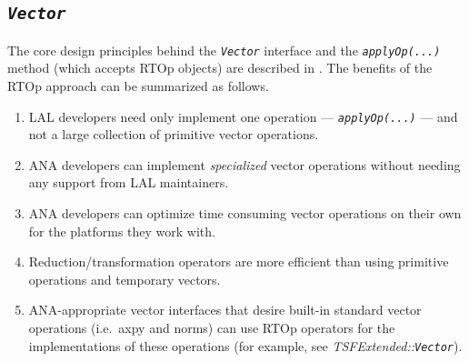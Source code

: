 %
\subsection{\texttt{\textit{Vector}}}
\label{tsfcore:sec:vector}
%

The core design principles behind the {}\texttt{\textit{Vector}}
interface and the {}\texttt{\textit{applyOp(\-...)}} method (which
accepts RTOp objects) are described in {}\cite{ref:rtop_toms}.  The
benefits of the RTOp approach can be summarized as follows.

\begin{enumerate}
\item
LAL developers need only implement one operation ---
{}\textit{\texttt{applyOp(\-...)}} --- and not a large collection of
primitive vector operations.
\item
ANA developers can implement {}\textit{specialized} vector operations
without needing any support from LAL maintainers.
\item
ANA developers can optimize time consuming vector operations on their
own for the platforms they work with.
\item
Reduction/transformation operators are more efficient than using
primitive operations and temporary vectors.
\item
ANA-appropriate vector interfaces that desire built-in standard vector
operations (i.e.~axpy and norms) can use RTOp operators for the
implementations of these operations (for example, see
{}\textit{TSFExtended\-::\texttt{Vector}}).
\end{enumerate}


